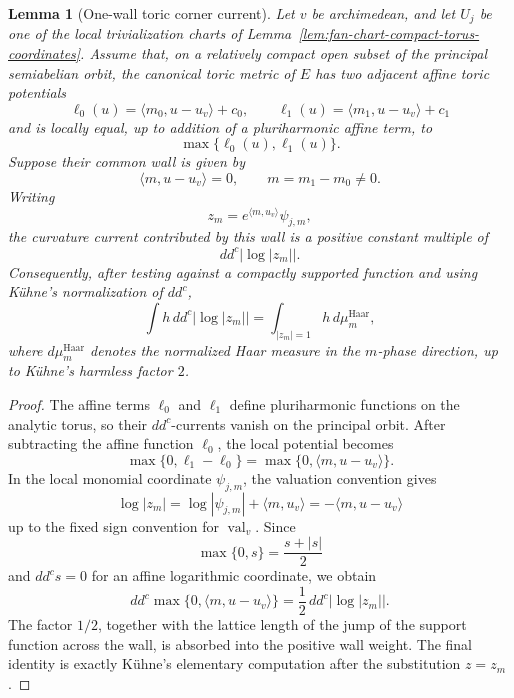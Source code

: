 \documentclass[10pt,a4paper]{amsart}
\theoremstyle{plain}
\newtheorem{lemma}[theorem]{Lemma}
\theoremstyle{plain}
\numberwithin{equation}{section}
\begin{document}
\begin{lemma}[One-wall toric corner current]
	\label{lem:one-wall-toric-corner-current}
	Let \(v\) be archimedean, and let \(U_j\) be one of the local
	trivialization charts of Lemma~\ref{lem:fan-chart-compact-torus-coordinates}.
	Assume that, on a relatively compact open subset of the principal
	semiabelian orbit, the canonical toric metric of \(E\) has two adjacent
	affine toric potentials
	\[
	\ell_0(u)=\langle m_0,u-u_v\rangle+c_0,\qquad
	\ell_1(u)=\langle m_1,u-u_v\rangle+c_1
	\]
	and is locally equal, up to addition of a pluriharmonic affine term, to
	\[
	\max\{\ell_0(u),\ell_1(u)\}.
	\]
	Suppose their common wall is given by
	\[
	\langle m,u-u_v\rangle=0,\qquad m=m_1-m_0\neq0 .
	\]
	Writing
	\[
	z_m=e^{\langle m,u_v\rangle}\psi_{j,m},
	\]
	the curvature current contributed by this wall is a positive constant multiple
	of
	\[
	dd^c\bigl|\log|z_m|\bigr|.
	\]
	Consequently, after testing against a compactly supported function and using
	K\"uhne's normalization of \(dd^c\),
	\[
	\int h\,dd^c\bigl|\log|z_m|\bigr|
	=
	\int_{|z_m|=1}h\,d\mu_m^{\mathrm{Haar}} ,
	\]
	where \(d\mu_m^{\mathrm{Haar}}\) denotes the normalized Haar measure in the \(m\)-phase
	direction, up to K\"uhne's harmless factor \(2\).
\end{lemma}

\begin{proof}
	The affine terms \(\ell_0\) and \(\ell_1\) define pluriharmonic functions on
	the analytic torus, so their \(dd^c\)-currents vanish on the principal orbit.
	After subtracting the affine function \(\ell_0\), the local potential becomes
	\[
	\max\{0,\ell_1-\ell_0\}
	=
	\max\{0,\langle m,u-u_v\rangle\}.
	\]
	In the local monomial coordinate \(\psi_{j,m}\), the valuation convention gives
	\[
	\log|z_m|
	=
	\log|\psi_{j,m}|+\langle m,u_v\rangle
	=
	-\langle m,u-u_v\rangle
	\]
	up to the fixed sign convention for \(\operatorname{val}_v\).  Since
	\[
	\max\{0,s\}=\frac{s+|s|}{2}
	\]
	and \(dd^c s=0\) for an affine logarithmic coordinate, we obtain
	\[
	dd^c\max\{0,\langle m,u-u_v\rangle\}
	=
	\frac12\,dd^c\bigl|\log|z_m|\bigr|.
	\]
	The factor \(1/2\), together with the lattice length of the jump of the
	support function across the wall, is absorbed into the positive wall weight.
	The final identity is exactly K\"uhne's elementary computation
	\cite[Appendix~B]{Ku1} after the substitution \(z=z_m\).
\end{proof}
\end{document}
